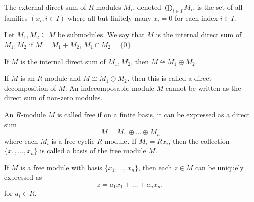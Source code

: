 \documentclass[11pt]{article}
\theoremstyle{definition}
\theoremstyle{remark}
\numberwithin{equation}{section}
\begin{document}
    \begin{definition}
        The external direct sum of $R$-modules $M_i$, denoted $\bigoplus_{i \in
        I} M_i$, is the set of all families $(x_i, i \in I)$ where all but finitely
        many $x_i = 0$ for each index $i \in I$.
    \end{definition}

    \begin{definition}
        Let $M_1, M_2 \subseteq M$ be submodules. We say that $M$ is the internal
        direct sum of $M_1, M_2$ if $M = M_1 + M_2$, $M_1 \cap M_2 = \{0\}$.
    \end{definition}

    \begin{lemma}
        If $M$ is the internal direct sum of $M_1, M_2$, then $M \cong M_1 \oplus
        M_2$.
    \end{lemma}
    \begin{definition}
        If $M$ is an $R$-module and $M \cong M_1 \oplus M_2$, then this is called a
        direct decomposition of $M$. An indecomposable module $M$ cannot be written
        as the direct sum of non-zero modules.
    \end{definition}

    \begin{definition}
        An $R$-module $M$ is called free if on a finite basis, it can be expressed as
        a direct sum \[
            M = M_1 \oplus \dots \oplus M_n
        \] where each $M_i$ is a free cyclic $R$-module. If $M_i = Rx_i$, then the
        collection $\{x_1, \dots, x_n\}$ is called a basis of the free module $M$.
    \end{definition}
    \begin{lemma}
        If $M$ is a free module with basis $\{x_1, \dots, x_n\}$, then each $z \in M$
        can be uniquely expressed as \[
            z = a_1x_1 + \dots + a_nx_n,
        \] for $a_i \in R$.
    \end{lemma}
\end{document}
